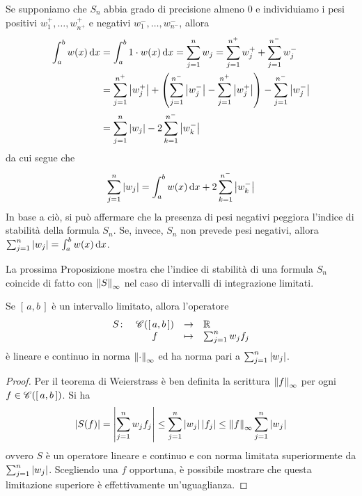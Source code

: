 	Se supponiamo che \(S_n\) abbia grado di precisione almeno \(0\) e individuiamo i pesi positivi \(w_1^+, \dots, w_{n^+}^+\) e negativi \(w_1^-, \dots, w_{n^-}^-\), allora
	\begin{equation*}
		\begin{split}
			\int_a^b w (x) \dd{x} &= \int_a^b 1 \cdot w (x) \dd{x} = \sum_{j = 1}^n w_j = \sum_{j = 1}^{n^+} w_j^+ + \sum_{j = 1}^{n^-} w_j^- \\
			&= \sum_{j = 1}^{n^+} \abs{w_j^+} + \qty(\sum_{j = 1}^{n^-} \abs{w_j^-} - \sum_{j = 1}^{n^+} \abs{w_j^+}) - \sum_{j = 1}^{n^-} \abs{w_j^-} \\
			&= \sum_{j = 1}^n \abs{w_j} - 2 \sum_{k = 1}^{n^-} \abs{w_k^-}
		\end{split}
	\end{equation*}
	da cui segue che
	\begin{equation}
		\sum_{j = 1}^n \abs{w_j} = \int_a^b w (x) \dd{x} + 2 \sum_{k = 1}^{n^-} \abs{w_k^-}
	\end{equation}
	In base a ciò, si può affermare che la presenza di pesi negativi peggiora l'indice di stabilità della formula \(S_n\). Se, invece, \(S_n\) non prevede pesi negativi, allora \(\sum_{j = 1}^n \abs{w_j} = \int_a^b w (x) \dd{x}\).
	
	La prossima Proposizione mostra che l'indice di stabilità di una formula \(S_n\) coincide di fatto con \(\norm{S}_\infty\) nel caso di intervalli di integrazione limitati.
	
	\begin{proposizione}\label{prop:norma-formula-quadratura}
		Se \([\, a, b \,]\) è un intervallo limitato, allora l'operatore
		\begin{equation*}
			\begin{array}{rccl}
				S \colon & \mathscr{C} ([\, a, b \,]) & \to & \mathbb{R} \\
				& f & \mapsto & \sum_{j = 1}^n w_j f_j
			\end{array}
		\end{equation*}
		è lineare e continuo in norma \(\norm{\cdot}_\infty\) ed ha norma pari a \(\sum_{j = 1}^{n} \abs{w_j}\).
	\end{proposizione}

	\begin{proof}
		Per il teorema di Weierstrass è ben definita la scrittura \(\norm{f}_\infty\) per ogni \(f \in \mathscr{C} ([\, a, b \,])\). Si ha
		\begin{equation*}
			\abs{S (f)} = \abs{\sum_{j = 1}^n w_j f_j} \le \sum_{j = 1}^n \abs{w_j} \, \abs{f_j} \le \norm{f}_\infty \sum_{j = 1}^n \abs{w_j}
		\end{equation*}
		ovvero \(S\) è un operatore lineare e continuo e con norma limitata superiormente da \(\sum_{j = 1}^{n} \abs{w_j}\). Scegliendo una \(f\) opportuna, è possibile mostrare che questa limitazione superiore è effettivamente un'uguaglianza.
	\end{proof}

